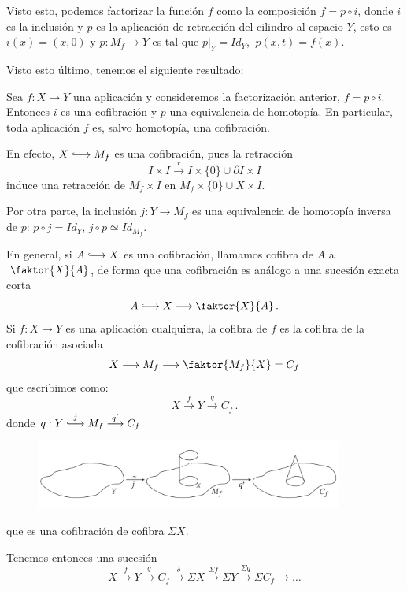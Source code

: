 Visto esto, podemos factorizar la función $f$ como la composición $f = p \circ i$, donde $i$ es la inclusión y $p$ es la aplicación de retracción del cilindro al espacio $Y$, esto es $i(x) = (x,0)$  y $p : M_f \longrightarrow Y$  es tal que $p \vert_Y = Id_Y$, $\ p(x,t) = f(x)$. \par 
Visto esto último, tenemos el siguiente resultado:
\newpage
\begin{teor}
Sea $f : X \longrightarrow Y$ una aplicación y consideremos la factorización anterior, $f = p \circ i$. Entonces $i$ es una cofibración y $p$ una equivalencia de homotopía. En particular, toda aplicación $f$ es, salvo homotopía, una cofibración. 
\end{teor}
\begin{demo}
En efecto, $X \longhookrightarrow M_f$ es una cofibración, pues la retracción 
\[
I \times I \stackrel{r}{\longrightarrow} I \times \{0\} \cup \partial I \times I
\]
induce una retracción de $M_f \times I$ en $M_f \times \{0\} \cup X \times  I$. \par 
Por otra parte, la inclusión $j : Y \longrightarrow M_f$ es una equivalencia de homotopía inversa de $p$: $p \circ j = Id_Y$, $j \circ p \simeq Id_{M_f}$.
\end{demo}
En general, si $A \longhookrightarrow X$ es una cofibración, llamamos cofibra de $A$ a $\: \faktor{X}{A}$, de forma que una cofibración es análogo a una sucesión exacta corta
\[ A \longhookrightarrow X \longrightarrow \faktor{X}{A} \, .\]
Si $f : X \longrightarrow Y$ es una aplicación cualquiera, la cofibra de $f$ es la cofibra de la cofibración asociada
\[ X \longrightarrow M_f \longrightarrow \faktor{M_f}{X} = C_f \]
que escribimos como: 
\[ X \stackrel{f}{\longrightarrow} Y \stackrel{q}{\longrightarrow} C_f \, . \]
donde $q : Y \stackrel{j}{\longhookrightarrow} M_f \stackrel{q'}{\longrightarrow} C_f $\par 
\begin{figure}[h]
\centering
\includegraphics[width = 0.9\textwidth]{images/cilindycono}
\end{figure}
que es una cofibración de cofibra $\Sigma X$. \par
Tenemos entonces una sucesión
\[ X \stackrel{f}{\longrightarrow} Y \stackrel{q}{\longrightarrow} C_f \stackrel{\delta}{\longrightarrow} \Sigma X \stackrel{\Sigma f}{\longrightarrow} \Sigma Y \stackrel{\Sigma q}{\longrightarrow} \Sigma C_f \longrightarrow \dots \]
